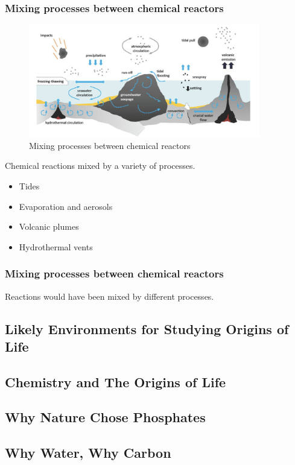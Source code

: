 \documentclass[]{article}
\begin{document}
\subsubsection{Mixing processes between chemical reactors}
\begin{figure}[h!]
	\caption{Mixing processes between chemical reactors \cite{stueken2013did}}
	\includegraphics[width=0.9\textwidth]{MixingProcesses}
\end{figure}
Chemical reactions mixed by a variety of processes.

\begin{itemize}
	\item Tides
	\item Evaporation and aerosols
	\item Volcanic plumes
	\item Hydrothermal vents
\end{itemize}
  
  
\subsubsection{Mixing processes between chemical reactors}
Reactions would have been mixed by different processes.\cite{stueken2013did}
\subsection{Likely Environments for Studying Origins of Life}
\subsection{Chemistry and The Origins of Life}
\subsection{Why Nature Chose Phosphates}
\subsection{Why Water, Why Carbon}
\end{document}
